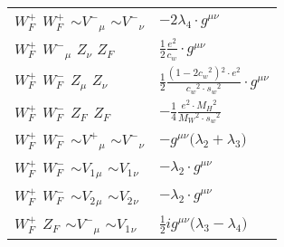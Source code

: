 \begin{center}
\begin{tabular}{|l|l|}
$W^+_F{}_{}$ \phantom{-} $W^+_F{}_{}$ \phantom{-} $\sim V^-{}_{\mu }$ \phantom{-} $\sim V^-{}_{\nu }$ \phantom{-}  &
	$-2 \lambda_4\cdot g^{\mu \nu} $\\[2mm]
$W^+_F{}_{}$ \phantom{-} $W^-{}_{\mu }$ \phantom{-} ${Z}_{\nu }$ \phantom{-} $Z_F{}_{}$ \phantom{-}  &
	$\frac{1}{2}\frac{ e{}^2 }{ c_w}\cdot g^{\mu \nu} $\\[2mm]
$W^+_F{}_{}$ \phantom{-} $W^-_F{}_{}$ \phantom{-} ${Z}_{\mu }$ \phantom{-} ${Z}_{\nu }$ \phantom{-}  &
	$\frac{1}{2}\frac{ (1-2 c_w {}^2){}^2  \cdot e{}^2 }{ c_w{}^2  \cdot s_w{}^2 }\cdot g^{\mu \nu} $\\[2mm]
$W^+_F{}_{}$ \phantom{-} $W^-_F{}_{}$ \phantom{-} $Z_F{}_{}$ \phantom{-} $Z_F{}_{}$ \phantom{-}  &
	$-\frac{1}{4}\frac{ e{}^2  \cdot M_H{}^2 }{ M_W{}^2  \cdot s_w{}^2 }$\\[2mm]
$W^+_F{}_{}$ \phantom{-} $W^-_F{}_{}$ \phantom{-} $\sim V^+{}_{\mu }$ \phantom{-} $\sim V^-{}_{\nu }$ \phantom{-}  &
	$-g^{\mu \nu} \big( \lambda_2+ \lambda_3\big)$\\[2mm]
$W^+_F{}_{}$ \phantom{-} $W^-_F{}_{}$ \phantom{-} $\sim V_1{}_{\mu }$ \phantom{-} $\sim V_1{}_{\nu }$ \phantom{-}  &
	$- \lambda_2\cdot g^{\mu \nu} $\\[2mm]
$W^+_F{}_{}$ \phantom{-} $W^-_F{}_{}$ \phantom{-} $\sim V_2{}_{\mu }$ \phantom{-} $\sim V_2{}_{\nu }$ \phantom{-}  &
	$- \lambda_2\cdot g^{\mu \nu} $\\[2mm]
$W^+_F{}_{}$ \phantom{-} $Z_F{}_{}$ \phantom{-} $\sim V^-{}_{\mu }$ \phantom{-} $\sim V_1{}_{\nu }$ \phantom{-}  &
	$\frac{1}{2} ig^{\mu \nu} \big( \lambda_3- \lambda_4\big)$\\ \hline
\end{tabular}


\end{center}
